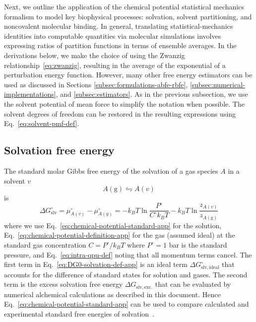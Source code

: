 \documentclass[9pt,bestpractices]{livecoms}
\begin{document}
Next, we outline the application of the chemical potential statistical mechanics formalism to model key biophysical processes: solvation, solvent partitioning, and noncovalent molecular binding. In general, translating statistical-mechanics identities into computable quantities via molecular simulations involves expressing ratios of partition functions in terms of ensemble averages. In the derivations below, we make the choice of using the Zwanzig relationship~\ref{eq:zwanzig}, resulting in the average of the exponential of a perturbation energy function.  However, many other free energy estimators can be used as discussed in Sections \ref{subsec:formulations-abfe-rbfe}, \ref{subsec:numerical-implementations},  and \ref{subsec:estimators}. As in the previous subsection, we use the solvent potential of mean force to simplify the notation when possible. The solvent degrees of freedom can be restored in the resulting expressions using Eq.~\ref{eq:solvent-pmf-def}. 

\subsection{Solvation free energy}\label{sec:derivation-solvation}

The standard molar Gibbs free energy of the solvation of a gas species $A$ in a solvent $v$
\begin{equation}
A(\mathrm{g})  \leftrightharpoons A(v)
\end{equation}
is
\begin{equation}
  \Delta G^\circ_{\mathrm{slv}} = \mu^\circ_{A(v)}  - \mu^\circ_{A(g)} = -k_B T \ln \frac{P^\circ}{C^\circ k_B T} - k_B T \ln \frac{z_{A(v)}}{z_{A(\mathrm{g})}}
  \label{eq:DG0-solvation-def-app}
\end{equation}
where we use Eq.~\ref{eq:chemical-potential-standard-app} for the solution, Eq.~\ref{eq:chemical-potential-definition-app} for the gas (assumed ideal) at the standard gas concentration $C = P^\circ/k_B T$ where $P^\circ = 1$ bar is the standard pressure, and Eq.~\ref{eq:intra-qpu-def} noting that all momentum terms cancel. The first term in Eq.~\ref{eq:DG0-solvation-def-app} is an ideal term $\Delta G^\circ_{\mathrm{slv,ideal}}$ that accounts for the difference of standard states for solution and gases. The second term is the excess solvation free energy $\Delta G_{\mathrm{slv, exc.}}$ that can be evaluated by numerical alchemical calculations as described in this document. Hence Eq.~\ref{eq:chemical-potential-standard-app} can be used to compare calculated and experimental standard free energies of solvation~\cite{thompson2004new}.
\end{document}
